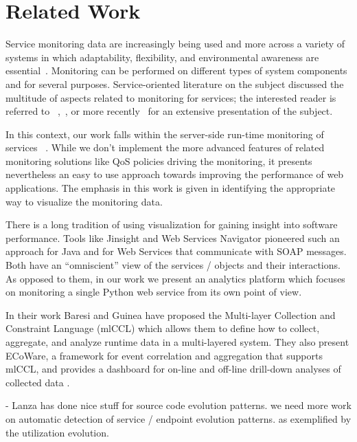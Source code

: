 
\section{Related Work}
\label{sec:related}

Service monitoring data are increasingly being used and more across a variety of systems in which adaptability, flexibility, and environmental awareness are essential~\cite{pernici2016monitoring}. Monitoring can be performed on different types of system components and for several purposes. Service-oriented literature on the subject discussed the multitude of aspects related to monitoring for services; the interested reader is referred to ~\cite{ghezzi2007run},~\cite{metzger2010analytical}, or more recently~\cite{pernici2016monitoring} for an extensive presentation of the subject. 

In this context, our work falls within the server-side run-time monitoring of services ~\cite{ghezzi2007run}. While we don't implement the more advanced features of related monitoring solutions like QoS policies driving the monitoring, it presents nevertheless an easy to use approach towards improving the performance of web applications. The emphasis in this work is given in identifying the appropriate way to visualize the monitoring data.
  
There is a long tradition of using visualization for gaining insight into software performance. Tools like Jinsight \cite{Pauw02a} and Web Services Navigator \cite{Pauw05} pioneered such an approach for Java and for Web Services that communicate with SOAP messages. Both have an ``omniscient'' view of the services / objects and their interactions. As opposed to them, in our work we present an analytics platform which focuses on monitoring a single Python web service from its own point of view.


In their work Baresi and Guinea have proposed the Multi-layer Collection and Constraint Language (mlCCL) which allows them to define how to collect, aggregate, and analyze runtime data in a multi-layered system. They also present ECoWare, a framework for event correlation and aggregation that supports mlCCL, and provides a dashboard for on-line and off-line drill-down analyses of collected data \cite{Bare13-monitoring}.

- Lanza has done nice stuff for source code evolution patterns. we need more work on automatic detection of service / endpoint evolution patterns. as exemplified by the utilization evolution.




